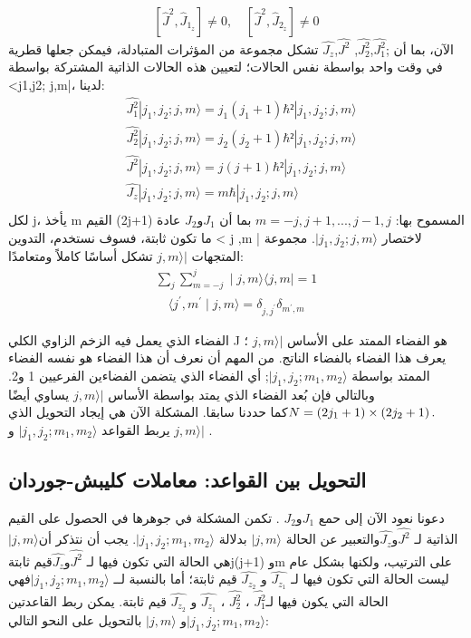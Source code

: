 \begin{equation}
	\left[\hat{J}^2, \hat{J}_{1_z}\right] \neq 0, \quad\left[\hat{J}^2, \hat{J}_{2_z}\right] \neq 0 
\end{equation}
الآن، بما أن ;$\hat{J^{2}_1}$,$\hat{J^{2}_2}$, $\hat{J^{2}}$,$\hat{J_z}$ تشكل مجموعة من المؤثرات المتبادلة، فيمكن جعلها قطرية في وقت واحد بواسطة نفس الحالات؛ لتعيين هذه الحالات الذاتية المشتركة بواسطة  <j1,j2; j,m|، 
لدينا:
\begin{equation}
	\begin{aligned}
		&   \hat{J^{2}_1}|j_1, j_2 ; j, m\rangle =j_1(j_1+1)\hbar²|j_1, j_2 ;j, m\rangle\\
			&	\hat{J^{2}_2}|j_1, j_2 ; j, m\rangle =j_2(j_2+1)\hbar²|j_1, j_2 ;j, m\rangle\\
				&	\hat{J^{2}}|j_1, j_2 ;j, m\rangle =j(j+1)\hbar²|j_1, j_2 ;j, m\rangle\\
		&\hat{J_z}|j_1, j_2 ;j, m\rangle =m\hbar|j_1, j_2 ; j, m\rangle\\
	\end{aligned}
\end{equation}
لكل j، يأخذ m القيم (2j+1) المسموح بها: 
$m=-j, j+1,..., j-1, j $
بما أن $J_1 $و$J_2$ عادة ما تكون ثابتة، فسوف نستخدم، التدوين < j ,m | لاختصار $ |j_1, j_2 ;j, m\rangle$. مجموعة المتجهات $ j, m\rangle|$ تشكل أساسًا كاملاً ومتعامدًا:
\begin{equation}
	\begin{aligned}
	\sum_j \sum_{m=-j}^j\mid j, m \rangle\langle j, m\mid=1\\\quad
	\langle j^{\prime}, m^{\prime}\mid j, m \rangle=\delta_{j, j^{\prime}} \delta_{m^{\prime}, m} 	
	\end{aligned}
\end{equation}

الفضاء الذي يعمل فيه الزخم الزاوي الكلي J هو الفضاء الممتد على الأساس $ j, m\rangle|$ ؛ يعرف هذا الفضاء بالفضاء الناتج. من المهم أن نعرف أن هذا الفضاء هو نفسه الفضاء الممتد بواسطة $\mid j_1, j_2 ; m_1, m_2\rangle$; أي الفضاء الذي يتضمن الفضاءين الفرعيين 1 و2. وبالتالي فإن بُعد الفضاء الذي يمتد بواسطة الأساس $ j, m\rangle|$ يساوي أيضًا $ 	N=\left(2 j_1+1\right) \times\left(2 j_2+1\right) . \\$كما حددنا سابقا.
المشكلة الآن هي إيجاد التحويل الذي يربط القواعد $\mid j_1, j_2 ; m_1, m_2\rangle$ و $ j, m\rangle|$ .
\subsection{التحويل بين القواعد: معاملات كليبش-جوردان}
دعونا نعود الآن إلى حمع  $J_1 $و$J_2$ . تكمن المشكلة في جوهرها في الحصول على القيم الذاتية لـ  $\hat{J^{2}}$و$\hat{J_z}$والتعبير عن الحالة 
$| j, m\rangle$ بدلالة $\mid j_1, j_2 ; m_1, m_2\rangle$. يجب أن نتذكر أن$ |j, m\rangle$
 هي الحالة التي تكون فيها لـ $\hat{J^{2}}$و$\hat{J_z}$قيم ثابتةj(j+1) وm على الترتيب، ولكنها بشكل عام ليست الحالة  التي تكون فيها لـ $\hat{J_{z_1}}$
و $\hat{J_{z_2}}$  قيم ثابتة؛ أما بالنسبة لــ 
$\mid j_1, j_2 ; m_1, m_2\rangle$فهي الحالة التي يكون فيها لـ$\hat{J^{2}_1}$ ، 
$\hat{J^{2}_2}$ ،
$\hat{J_{z_1}}$
و $\hat{J_{z_2}}$  قيم ثابتة.
يمكن ربط القاعدتين 
$\mid j_1, j_2 ; m_1, m_2\rangle$و 
$ |j, m\rangle$ بالتحويل على النحو التالي:

